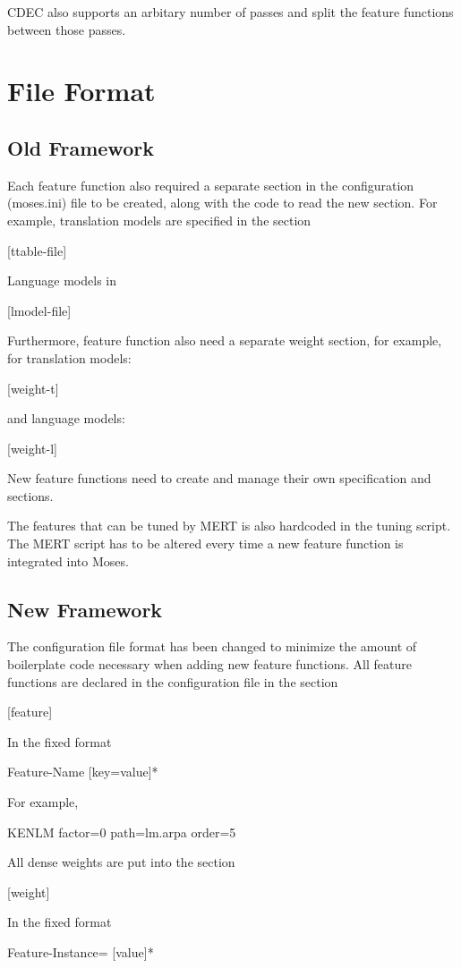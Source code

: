 \documentclass{pbml}
\begin{document}
CDEC also supports an arbitary number of passes and split the feature functions between those passes.

\section{File Format}
\subsection{Old Framework}
Each feature function also required a separate section in the configuration (moses.ini) file to be created, along with the code to read the new section. For example, translation models are specified in the section

  [ttable-file]

Language models in

  [lmodel-file]

Furthermore, feature function also need a separate weight section, for example, for translation models:

  [weight-t]

and language models:

 [weight-l]

New feature functions need to create and manage their own specification and sections.

The features that can be tuned by MERT is also hardcoded in the tuning script. The MERT script has to be altered every time a new feature function is integrated into Moses.

\subsection{New Framework}
The configuration file format has been changed to minimize the amount of boilerplate code necessary when adding new feature functions. All feature functions are declared in the configuration file in the section

  [feature]

In the fixed format

  Feature-Name [key=value]*

For example,

  KENLM factor=0 path=lm.arpa order=5

All dense weights are put into the section

  [weight]

In the fixed format

  Feature-Instance= [value]*
\end{document}
